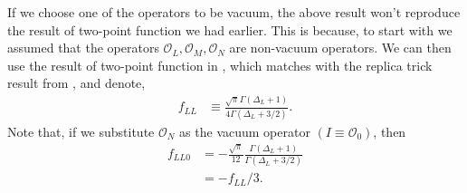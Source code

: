 \documentclass[11pt]{article}
\newcommand{\mO}{\mathcal{O}}
\begin{document}
If we choose one of the operators to be vacuum, the above result won't reproduce the result of two-point function we had earlier. This is because, to start with we assumed that the operators $\mO_L, \mO_M,\mO_N$ are non-vacuum operators. We can then use the result of two-point function in \cite{S_rosi_2018}, which matches with the replica trick result from \cite{calabrese2011entanglement}, and denote, 
\begin{align}
    f_{LL} &\equiv \frac{\sqrt{\pi }\Gamma(\Delta_L+1)}{4 \Gamma(\Delta_L + 3/2)}.
\end{align}
Note that, if we substitute $\mO_N$ as the vacuum operator $(I \equiv \mO_0)$, then
\begin{align}
    f_{LL0} &=-\frac{\sqrt \pi}{12}\frac{\Gamma(\Delta_L+1)}{\Gamma(\Delta_L+3/2)} \\
    &=-f_{LL}/3.
\end{align}
\end{document}
